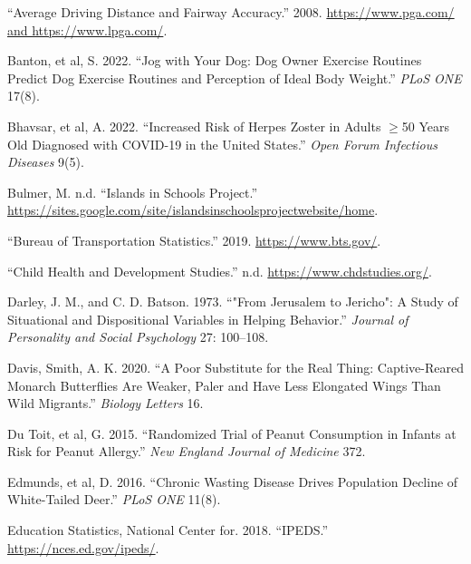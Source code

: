 \documentclass[
]{report}
\newlength{\cslhangindent}
\newenvironment{CSLReferences}[2] %
 {\begin{list}{}{%
  \setlength{\itemindent}{0pt}
  \setlength{\leftmargin}{0pt}
  \setlength{\parsep}{0pt}
  \ifodd #1
   \setlength{\leftmargin}{\cslhangindent}
   \setlength{\itemindent}{-1\cslhangindent}
  \fi
  \setlength{\itemsep}{#2\baselineskip}}}
 {\end{list}}
\begin{document}
\newpage

\label{refs}
\begin{CSLReferences}{1}{0}
{``Average Driving Distance and Fairway Accuracy.''} 2008. \href{https://www.pga.com/\%20and\%20https://www.lpga.com/}{https://www.pga.com/ and https://www.lpga.com/}.

Banton, et al, S. 2022. {``Jog with Your Dog: Dog Owner Exercise Routines Predict Dog Exercise Routines and Perception of Ideal Body Weight.''} \emph{PLoS ONE} 17(8).

Bhavsar, et al, A. 2022. {``Increased Risk of Herpes Zoster in Adults \(\geq\)50 Years Old Diagnosed with COVID-19 in the United States.''} \emph{Open Forum Infectious Diseases} 9(5).

Bulmer, M. n.d. {``Islands in Schools Project.''} \url{https://sites.google.com/site/islandsinschoolsprojectwebsite/home}.

{``Bureau of Transportation Statistics.''} 2019. \url{https://www.bts.gov/}.

{``Child Health and Development Studies.''} n.d. \url{https://www.chdstudies.org/}.

Darley, J. M., and C. D. Batson. 1973. {``"From Jerusalem to Jericho": A Study of Situational and Dispositional Variables in Helping Behavior.''} \emph{Journal of Personality and Social Psychology} 27: 100--108.

Davis, Smith, A. K. 2020. {``A Poor Substitute for the Real Thing: Captive-Reared Monarch Butterflies Are Weaker, Paler and Have Less Elongated Wings Than Wild Migrants.''} \emph{Biology Letters} 16.

Du Toit, et al, G. 2015. {``Randomized Trial of Peanut Consumption in Infants at Risk for Peanut Allergy.''} \emph{New England Journal of Medicine} 372.

Edmunds, et al, D. 2016. {``Chronic Wasting Disease Drives Population Decline of White-Tailed Deer.''} \emph{PLoS ONE} 11(8).

Education Statistics, National Center for. 2018. {``IPEDS.''} \url{https://nces.ed.gov/ipeds/}.


\end{CSLReferences}
\end{document}
